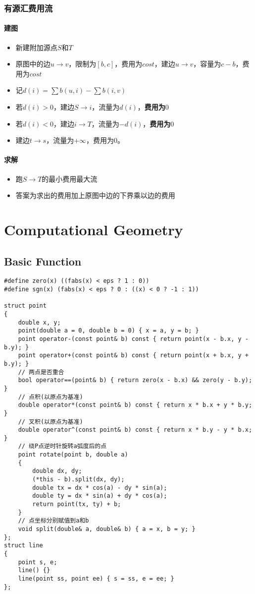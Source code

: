 \documentclass[twoside]{article}
\begin{document}
\subsubsection*{有源汇费用流}
\paragraph{建图}
\begin{itemize}
\item 新建附加源点$S$和$T$
\item 原图中的边$u \rightarrow v$，限制为$[b,c]$，费用为$cost$，建边$u \rightarrow v$，容量为$c-b$，费用为$cost$
\item 记$d(i) = \sum b(u,i) - \sum b(i,v) $
\item 若$d(i)>0$，建边$S \rightarrow i$，流量为$d(i)$，\textbf{费用为$0$}
\item 若$d(i)<0$，建边$i \rightarrow T$，流量为$-d(i)$，\textbf{费用为$0$}
\item 建边$t \rightarrow s$，流量为$+\infty$，费用为$0$。
\end{itemize}

\paragraph{求解}
\begin{itemize}
\item 跑$S \rightarrow T$的最小费用最大流
\item 答案为求出的费用加上原图中边的下界乘以边的费用
\end{itemize}
\clearpage\section{Computational Geometry}
\subsection{Basic Function}
\begin{lstlisting}
#define zero(x) ((fabs(x) < eps ? 1 : 0))
#define sgn(x) (fabs(x) < eps ? 0 : ((x) < 0 ? -1 : 1))

struct point
{
    double x, y;
    point(double a = 0, double b = 0) { x = a, y = b; }
    point operator-(const point& b) const { return point(x - b.x, y - b.y); }
    point operator+(const point& b) const { return point(x + b.x, y + b.y); }
    // 两点是否重合
    bool operator==(point& b) { return zero(x - b.x) && zero(y - b.y); }
    // 点积(以原点为基准)
    double operator*(const point& b) const { return x * b.x + y * b.y; }
    // 叉积(以原点为基准)
    double operator^(const point& b) const { return x * b.y - y * b.x; }
    // 绕P点逆时针旋转a弧度后的点
    point rotate(point b, double a)
    {
        double dx, dy;
        (*this - b).split(dx, dy);
        double tx = dx * cos(a) - dy * sin(a);
        double ty = dx * sin(a) + dy * cos(a);
        return point(tx, ty) + b;
    }
    // 点坐标分别赋值到a和b
    void split(double& a, double& b) { a = x, b = y; }
};
struct line
{
    point s, e;
    line() {}
    line(point ss, point ee) { s = ss, e = ee; }
};
\end{lstlisting}
\end{document}
